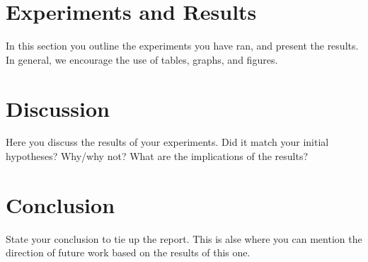 \documentclass[10pt]{article}
\begin{document}
\section{Experiments and Results}
In this section you outline the experiments you have ran, and present the results.
In general, we encourage the use of tables, graphs, and figures.

\section{Discussion}
Here you discuss the results of your experiments. Did it match your initial hypotheses? Why/why not? What are the implications of the results?

\section{Conclusion}
State your conclusion to tie up the report. This is alse where you can mention the direction of future work based on the results of this one.



\end{document}
